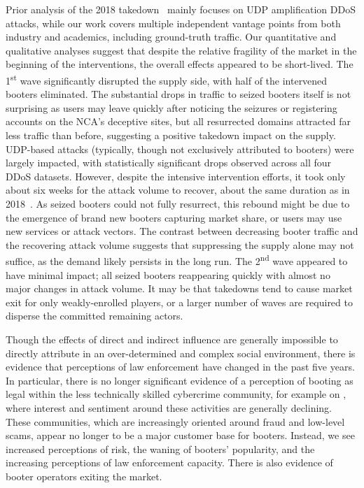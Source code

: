 \documentclass[letterpaper,twocolumn,10pt]{article}
\begin{document}
 Prior analysis of the 2018 takedown~\cite{collier2019booting} mainly focuses on UDP amplification DDoS attacks, while our work covers multiple independent vantage points from both industry and academics, including ground-truth traffic. Our quantitative and qualitative analyses suggest that despite the relative fragility of the market in the beginning of the interventions, the overall effects appeared to be short-lived. The 1\textsuperscript{st} wave significantly disrupted the supply side, with half of the intervened booters eliminated. The substantial drops in traffic to seized booters itself is not surprising as users may leave quickly after noticing the seizures or registering accounts on the NCA's deceptive sites, but all resurrected domains attracted far less traffic than before, suggesting a positive takedown impact on the supply. UDP-based attacks (typically, though not exclusively attributed to booters) were largely impacted, with statistically significant drops observed across all four DDoS datasets. However, despite the intensive intervention efforts, it took only about six weeks for the attack volume to recover, about the same duration as in 2018~\cite{collier2019booting}. As seized booters could not fully resurrect, this rebound might be due to the emergence of brand new booters capturing market share, or users may use new services or attack vectors. The contrast between decreasing booter traffic and the recovering attack volume suggests that suppressing the supply alone may not suffice, as the demand likely persists in the long run. The 2\textsuperscript{nd} wave appeared to have minimal impact; all seized booters reappearing quickly with almost no major changes in attack volume. It may be that takedowns tend to cause market exit for only weakly-enrolled players, or a larger number of waves are required to disperse the committed remaining actors.

Though the effects of direct and indirect influence are generally impossible to directly attribute in an over-determined and complex social environment, there is evidence that perceptions of law enforcement have changed in the past five years. In particular, there is no longer significant evidence of a perception of booting as legal within the less technically skilled cybercrime community, for example on \hackforums, where interest and sentiment around these activities are generally declining. These communities, which are increasingly oriented around fraud and low-level scams, appear no longer to be a major customer base for booters. Instead, we see increased perceptions of risk, the waning of booters' popularity, and the increasing perceptions of law enforcement capacity. There is also evidence of booter operators exiting the market.
\end{document}
